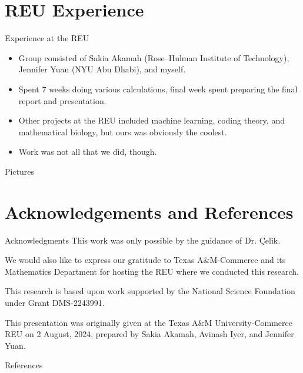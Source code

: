 \documentclass{reu_beamer}
\begin{document}
\section{REU Experience}
\begin{frame}{Experience at the REU}
  \begin{itemize}
    \item Group consisted of Sakia Akamah (Rose--Hulman Institute of Technology), Jennifer Yuan (NYU Abu Dhabi), and myself.
    \item Spent 7 weeks doing various calculations, final week spent preparing the final report and presentation.
    \item Other projects at the REU included machine learning, coding theory, and mathematical biology, \pause but ours was obviously the coolest.\pause
    \item Work was not all that we did, though.
  \end{itemize}
\end{frame}
\begin{frame}{Pictures}

\end{frame}
\section{Acknowledgements and References}
    \begin{frame}{Acknowledgments}
    \centering
    This work was only possible by the guidance of Dr. \c{C}elik.\newline
    
    We would also like to express our gratitude to Texas A\&M-Commerce and its Mathematics Department for hosting the REU where we conducted this research.\newline
    
    This research is based upon work supported by the National Science Foundation under Grant DMS-2243991.\newline
    
    This presentation was originally given at the Texas A\&M University-Commerce REU on 2 August, 2024, prepared by Sakia Akamah, Avinash Iyer, and Jennifer Yuan.
\end{frame}
%
\begin{frame}[allowframebreaks]{References}
\nocite{*}

{\small}
\end{frame}

\end{document}
